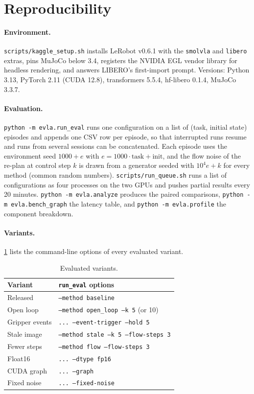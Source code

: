 \section{Reproducibility}
\label{app:repro}

\paragraph{Environment.}
\texttt{scripts/kaggle\_setup.sh} installs LeRobot v0.6.1 with the \texttt{smolvla} and \texttt{libero} extras, pins MuJoCo below 3.4, registers the NVIDIA EGL vendor library for headless rendering, and answers LIBERO's first-import prompt.
Versions: Python 3.13, PyTorch 2.11 (CUDA 12.8), transformers 5.5.4, hf-libero 0.1.4, MuJoCo 3.3.7.

\paragraph{Evaluation.}
\texttt{python -m evla.run\_eval} runs one configuration on a list of (task, initial state) episodes and appends one CSV row per episode, so that interrupted runs resume and runs from several sessions can be concatenated.
Each episode uses the environment seed $1000+e$ with $e=1000\cdot\text{task}+\text{init}$, and the flow noise of the re-plan at control step $k$ is drawn from a generator seeded with $10^4 e+k$ for every method (common random numbers).
\texttt{scripts/run\_queue.sh} runs a list of configurations as four processes on the two GPUs and pushes partial results every 20 minutes.
\texttt{python -m evla.analyze} produces the paired comparisons, \texttt{python -m evla.bench\_graph} the latency table, and \texttt{python -m evla.profile} the component breakdown.

\paragraph{Variants.}
\cref{tab:variants} lists the command-line options of every evaluated variant.

\begin{table}[h]
\centering\footnotesize
\setlength{\tabcolsep}{3pt}
\begin{tabular}{@{}ll@{}}
\toprule
Variant & \texttt{run\_eval} options \\
\midrule
Released & \texttt{--method baseline} \\
Open loop & \texttt{--method open\_loop --k 5} (or 10) \\
Gripper events & \texttt{... --event-trigger --hold 5} \\
Stale image & \texttt{--method stale --k 5 --flow-steps 3} \\
Fewer steps & \texttt{--method flow --flow-steps 3} \\
Float16 & \texttt{... --dtype fp16} \\
CUDA graph & \texttt{... --graph} \\
Fixed noise & \texttt{... --fixed-noise} \\
\bottomrule
\end{tabular}
\caption{Evaluated variants.}
\label{tab:variants}
\end{table}


